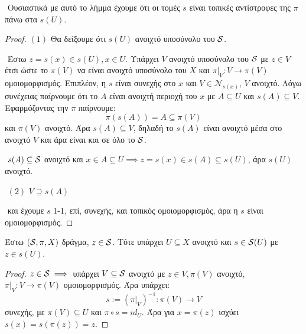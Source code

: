 $ $\newline
Ουσιαστικά με αυτό το λήμμα έχουμε ότι οι τομές $s$ είναι τοπικές αντίστροφες της $\pi$ πάνω στα $s(U)$.
\begin{proof} $(1)$ Θα δείξουμε ότι $s(U)$ ανοιχτό υποσύνολο του $\mathcal{S}$.

    $ $\newline
    Έστω $z = s(x) \in s(U), x\in U$. Υπάρχει $V$ ανοιχτό υποσύνολο του $\mathcal{S}$ με $z \in V$ έτσι ώστε το $\pi (V)$ να είναι ανοιχτό υποσύνολο του $X$ και $\pi |_V:V\rightarrow \pi (V)$ ομοιομορφισμός. Επιπλέον, η $s$ είναι συνεχής στο $x$ και $V \in \mathcal{N}_{s(x)}$, $V$ ανοιχτό. Λόγω συνέχειας παίρνουμε ότι το $A$ είναι ανοιχτή περιοχή του $x$ με $A \subseteq U$ και $s(A) \subseteq V$. Εφαρμόζοντας την $\pi$ παίρνουμε:
    $$\pi (s(A)) = A \subseteq \pi (V)$$ και $\pi(V)$ ανοιχτό. Άρα $s(A) \subseteq V$, δηλαδή το $s(A)$ είναι ανοιχτό μέσα στο ανοιχτό $V$ και άρα είναι και σε όλο το $\mathcal{S}$.

    $ $\newline
    $s(A) \subseteq \mathcal{S}$ ανοιχτό και $x \in A \subseteq U \implies z = s(x) \in s(A) \subseteq s(U)$, άρα $s(U)$ ανοιχτό.

    $ $\newline
    $(2)$ $V\supseteq s(A)$

    \begin{figure}[H]
        \centering
    \end{figure}
    $ $\newline
    και έχουμε $s$ 1-1, επί, συνεχής, και τοπικός ομοιομορφισμός, άρα η $s$ είναι ομοιομορφισμός.

\end{proof}

\begin{lemma}
    Έστω $(\mathcal{S}, \pi, X)$ δράγμα, $z \in \mathcal{S}$. Τότε υπάρχει $U\subseteq X$ ανοιχτό και $s \in \mathcal{S} (U)$ με $z \in s(U)$.
\end{lemma}

\begin{proof} $z \in \mathcal{S} \implies$ υπάρχει $V \subseteq \mathcal{S}$ ανοιχτό με $z \in V, \pi(V)$ ανοιχτό, $\pi |_V:V\rightarrow \pi (V)$ ομοιομορφισμός. Άρα υπάρχει:
    $$s:= \left(\pi |_V\right)^{-1} : \pi (V) \longrightarrow V$$ συνεχής, με $\pi (V) \subseteq U$ και $\pi \circ s = id_U$. Άρα για $x = \pi (z)$ ισχύει $s(x) = s(\pi(z)) = z$.
\end{proof}

